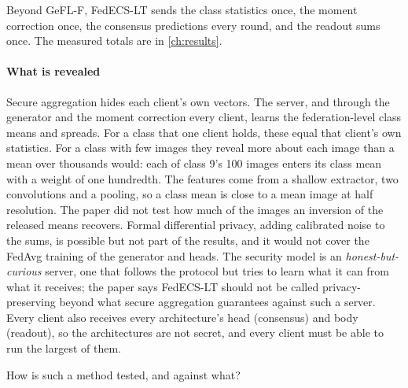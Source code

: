 Beyond GeFL-F, FedECS-LT sends the class statistics once, the moment correction once, the consensus predictions every
round, and the readout sums once. The measured totals are in \cref{ch:results}.

\paragraph{What is revealed} Secure aggregation hides each client's own vectors. The server, and through the generator
and the moment correction every client, learns the federation-level class means and spreads. For a class that one
client holds, these equal that client's own statistics. For a class with few images they reveal more about each image
than a mean over thousands would: each of class 9's 100 images enters its class mean with a weight of one hundredth. The features
come from a shallow extractor, two convolutions and a pooling, so a class mean is close to a mean image at half
resolution. The paper did not test how much of the images an inversion of the released means recovers. Formal
differential privacy, adding calibrated noise to the sums, is possible but not part of the results, and it would not
cover the FedAvg training of the generator and heads. The security model is an \emph{honest-but-curious} server, one
that follows the protocol but tries to learn what it can from what it receives; the paper says FedECS-LT should not be
called privacy-preserving beyond what secure aggregation guarantees against such a server. Every client also receives
every architecture's head (consensus) and body (readout), so the architectures are not secret, and every client must be
able to run the largest of them.

How is such a method tested, and against what?
